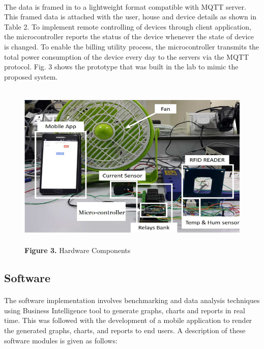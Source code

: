 \documentclass[a4paper,12pt,oneside]{article}
\let\counterwithin\relax
\begin{document}
\paragraph{}
The data is framed in to a lightweight format compatible with MQTT server. This
framed data is attached with the user, house and device details
as shown in Table 2. To implement remote controlling of
devices through client application, the microcontroller reports
the status of the device whenever the state of device is
changed. To enable the billing utility process, the
microcontroller transmits the total power consumption of the
device every day to the servers via the MQTT protocol. Fig. 3
shows the prototype that was built in the lab to mimic the
proposed system.
\begin{figure}[H]
\includegraphics[height=8cm,width=16cm]{Figure3.png}
\centering
\caption{\textbf{Figure 3.} Hardware Components}
\end{figure}

\subsection{Software}
\paragraph{}
The software implementation involves benchmarking and
data analysis techniques using Business Intelligence tool to
generate graphs, charts and reports in real time. This was
followed with the development of a mobile application to
render the generated graphs, charts, and reports to end users. A
description of these software modules is given as follows:
\end{document}
